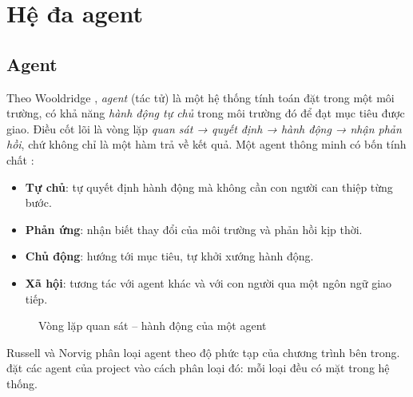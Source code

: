 \chapter{Hệ đa agent}
\label{chap:mas}

\section{Agent}

Theo Wooldridge \cite{wooldridge2009}, \emph{agent} (tác tử) là một hệ thống tính toán đặt trong một môi trường, có khả năng \emph{hành động tự chủ} trong môi trường đó để đạt mục tiêu được giao. Điều cốt lõi là vòng lặp \emph{quan sát → quyết định → hành động → nhận phản hồi}, chứ không chỉ là một hàm trả về kết quả. Một agent thông minh có bốn tính chất \cite{jennings1998}:
\begin{itemize}
  \item \textbf{Tự chủ}: tự quyết định hành động mà không cần con người can thiệp từng bước.
  \item \textbf{Phản ứng}: nhận biết thay đổi của môi trường và phản hồi kịp thời.
  \item \textbf{Chủ động}: hướng tới mục tiêu, tự khởi xướng hành động.
  \item \textbf{Xã hội}: tương tác với agent khác và với con người qua một ngôn ngữ giao tiếp.
\end{itemize}

\begin{figure}[H]
\centering
{}
\caption{Vòng lặp quan sát – hành động của một agent}
\label{fig:agent-loop}
\end{figure}

Russell và Norvig \cite{russell2021} phân loại agent theo độ phức tạp của chương trình bên trong.  đặt các agent của project vào cách phân loại đó: mỗi loại đều có mặt trong hệ thống.

